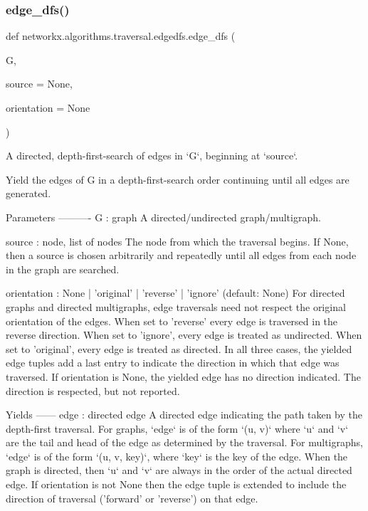 \subsubsection{\texorpdfstring{edge\+\_\+dfs()}{edge\_dfs()}}
{\footnotesize\ttfamily def networkx.\+algorithms.\+traversal.\+edgedfs.\+edge\+\_\+dfs (\begin{DoxyParamCaption}\item[{}]{G,  }\item[{}]{source = {\ttfamily None},  }\item[{}]{orientation = {\ttfamily None} }\end{DoxyParamCaption})}

\begin{DoxyVerb}A directed, depth-first-search of edges in `G`, beginning at `source`.

Yield the edges of G in a depth-first-search order continuing until
all edges are generated.

Parameters
----------
G : graph
    A directed/undirected graph/multigraph.

source : node, list of nodes
    The node from which the traversal begins. If None, then a source
    is chosen arbitrarily and repeatedly until all edges from each node in
    the graph are searched.

orientation : None | 'original' | 'reverse' | 'ignore' (default: None)
    For directed graphs and directed multigraphs, edge traversals need not
    respect the original orientation of the edges.
    When set to 'reverse' every edge is traversed in the reverse direction.
    When set to 'ignore', every edge is treated as undirected.
    When set to 'original', every edge is treated as directed.
    In all three cases, the yielded edge tuples add a last entry to
    indicate the direction in which that edge was traversed.
    If orientation is None, the yielded edge has no direction indicated.
    The direction is respected, but not reported.

Yields
------
edge : directed edge
    A directed edge indicating the path taken by the depth-first traversal.
    For graphs, `edge` is of the form `(u, v)` where `u` and `v`
    are the tail and head of the edge as determined by the traversal.
    For multigraphs, `edge` is of the form `(u, v, key)`, where `key` is
    the key of the edge. When the graph is directed, then `u` and `v`
    are always in the order of the actual directed edge.
    If orientation is not None then the edge tuple is extended to include
    the direction of traversal ('forward' or 'reverse') on that edge.


\end{DoxyVerb}
